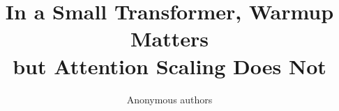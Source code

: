 \documentclass{article}
\title{In a Small Transformer, Warmup Matters\\but Attention Scaling Does Not}
\author{Anonymous authors}
\begin{document}
\maketitle

\begin{abstract}

\end{abstract}







\label{pw:mainend}





\end{document}
